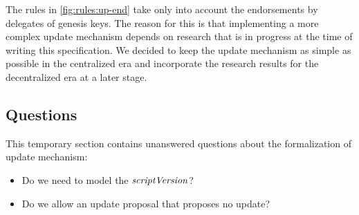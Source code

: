 The rules in \cref{fig:rules:up-end} take only into account the endorsements by
delegates of genesis keys. The reason for this is that implementing a more
complex update mechanism depends on research that is in progress at the time of
writing this specification. We decided to keep the update mechanism as simple
as possible in the centralized era and incorporate the research results for the
decentralized era at a later stage.

\subsection{Questions}
\label{sec:up-questions}

This temporary section contains unanswered questions about the formalization of
update mechanism:

\begin{itemize}
\item Do we need to model the $\mathit{scriptVersion}$?
\item Do we allow an update proposal that proposes no update?
\end{itemize}
